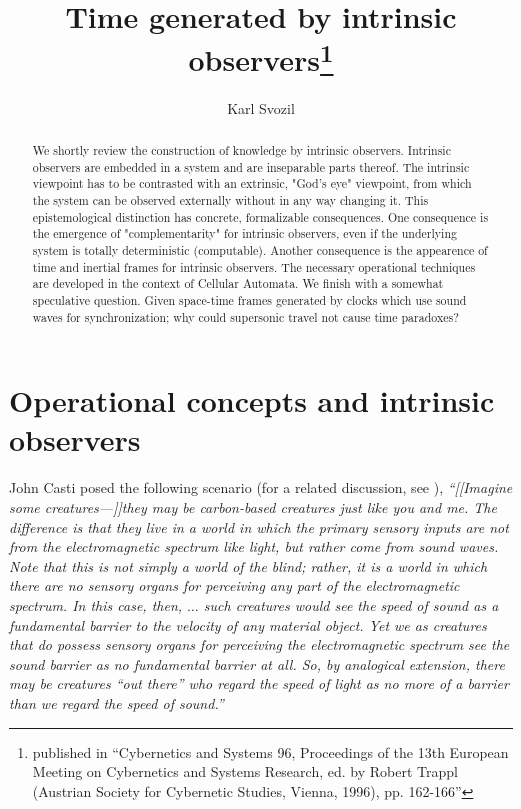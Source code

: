 \documentclass[pra,amsfonts, twocolumn]{revtex4}
\begin{document}
\title{Time generated by intrinsic observers\footnote{published in ``Cybernetics and Systems 96, Proceedings of the 13th European Meeting on Cybernetics and Systems Research, ed. by Robert Trappl (Austrian Society for Cybernetic Studies, Vienna, 1996), pp. 162-166''}}
\author{Karl Svozil}
\begin{abstract}
 We shortly review the construction of knowledge by intrinsic observers. Intrinsic observers are embedded in a system and are inseparable parts
thereof.  The intrinsic viewpoint has to be contrasted with an extrinsic, "God's eye" viewpoint, from which the system can be observed externally without in any way changing it.  This epistemological distinction has concrete, formalizable consequences.  One consequence is the emergence of  "complementarity" for intrinsic observers, even if the underlying system is totally deterministic (computable).  Another consequence is the appearence of time and inertial frames for intrinsic observers.  The necessary operational techniques are developed in the context of  Cellular Automata.  We finish with a somewhat speculative question.  Given space-time frames generated by clocks which use sound waves for synchronization; why could supersonic travel not cause time paradoxes?
\end{abstract}

\maketitle


\section{Operational concepts and intrinsic observers}

John Casti posed the following scenario
\cite{casti-priv}
(for a
related discussion, see
\cite{sv:86a}),
{\em
``[[Imagine some creatures---]]they may be carbon-based creatures just
like you and me. The difference is that they live in a world in which the
primary sensory inputs are not from the electromagnetic spectrum like
light, but rather come from sound waves. Note that this is not simply a
world of the blind; rather, it is a world in which there are no sensory
organs for perceiving any part of the electromagnetic spectrum. In this
case, then, $\ldots$ such creatures would see the speed of sound
as a fundamental barrier to the velocity of any material object. Yet we
as creatures that {\em do} possess sensory organs for perceiving the
electromagnetic
spectrum see the sound barrier as no fundamental barrier at all. So, by
analogical extension, there may be creatures ``out there'' who regard the
speed of light as no more of a barrier than we regard the speed of
sound.''
}
\end{document}
